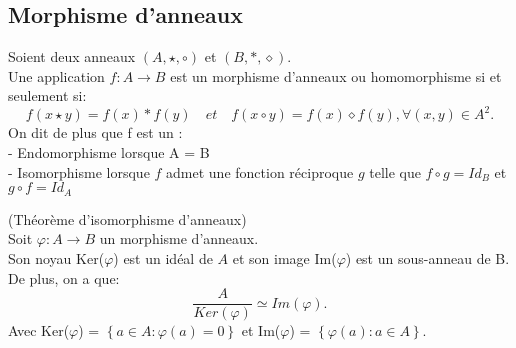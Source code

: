 \subsection{Morphisme d'anneaux}
\begin{madefinition}
	Soient deux anneaux $(A,\star, \circ )$ et $(B, \ast, \diamond)$.\\
	Une application $f:A \longrightarrow B$ est un morphisme d'anneaux  ou homomorphisme si et seulement si:
	\[ f(x \star y) = f(x) \ast f(y) \quad et \quad f(x \circ y) = f(x) \diamond f(y), \forall (x,y) \in A^2.\]
	On dit de plus que f est un :\\
	- Endomorphisme lorsque A = B \\
	- Isomorphisme lorsque $f$ admet une fonction réciproque $g$ telle que $f \circ g = Id_B$ et $g \circ f = Id_A$ 
\end{madefinition}
\begin{maproposition}
	(Théorème d'isomorphisme d'anneaux)\\
	Soit $\varphi:A \longrightarrow B$ un morphisme d'anneaux.\\
	Son noyau Ker($\varphi$) est un idéal de $A$ et son image Im($\varphi$) est un sous-anneau de B.\\ De plus, on a que:
	\[ \dfrac{A}{Ker(\varphi)} \simeq  Im(\varphi).\]
	Avec Ker($\varphi$) = $\left\{a \in A : \varphi(a) = 0 \right\}$ 
	et Im($\varphi$) = $\left\{\varphi(a) : a \in A \right\}$.
\end{maproposition}
